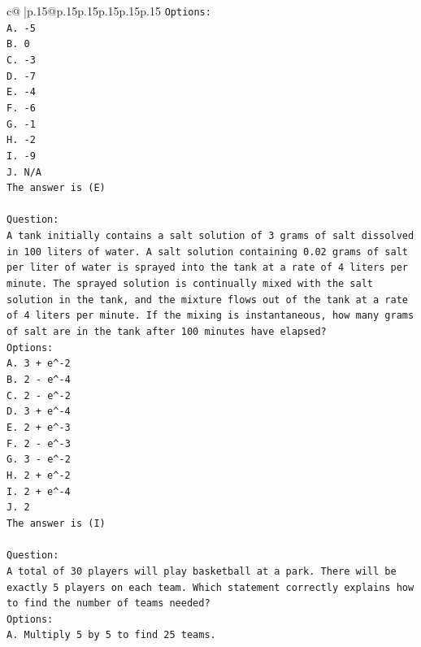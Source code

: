 \documentclass{article}
\begin{document}
{\begin{supertabular}{c@{$\;$}|p{.15\linewidth}@{}p{.15\linewidth}p{.15\linewidth}p{.15\linewidth}p{.15\linewidth}p{.15\linewidth}}
{{{\texttt{Options:} \\
\texttt{A. {-}5} \\
\texttt{B. 0} \\
\texttt{C. {-}3} \\
\texttt{D. {-}7} \\
\texttt{E. {-}4} \\
\texttt{F. {-}6} \\
\texttt{G. {-}1} \\
\texttt{H. {-}2} \\
\texttt{I. {-}9} \\
\texttt{J. N/A} \\
\texttt{The answer is (E)} \\
\\ 
\texttt{Question:} \\
\texttt{A tank initially contains a salt solution of 3 grams of salt dissolved in 100 liters of water. A salt solution containing 0.02 grams of salt per liter of water is sprayed into the tank at a rate of 4 liters per minute. The sprayed solution is continually mixed with the salt solution in the tank, and the mixture flows out of the tank at a rate of 4 liters per minute. If the mixing is instantaneous, how many grams of salt are in the tank after 100 minutes have elapsed?} \\
\texttt{Options:} \\
\texttt{A. 3 + e\^{}{-}2} \\
\texttt{B. 2 {-} e\^{}{-}4} \\
\texttt{C. 2 {-} e\^{}{-}2} \\
\texttt{D. 3 + e\^{}{-}4} \\
\texttt{E. 2 + e\^{}{-}3} \\
\texttt{F. 2 {-} e\^{}{-}3} \\
\texttt{G. 3 {-} e\^{}{-}2} \\
\texttt{H. 2 + e\^{}{-}2} \\
\texttt{I. 2 + e\^{}{-}4} \\
\texttt{J. 2} \\
\texttt{The answer is (I)} \\
\\ 
\texttt{Question:} \\
\texttt{A total of 30 players will play basketball at a park. There will be exactly 5 players on each team. Which statement correctly explains how to find the number of teams needed?} \\
\texttt{Options:} \\
\texttt{A. Multiply 5 by 5 to find 25 teams.} \\
}}}
\end{supertabular}}
\end{document}
